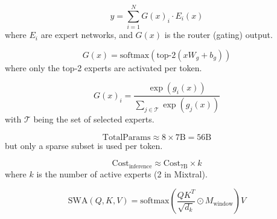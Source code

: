 
\begin{equation}
y = \sum_{i=1}^{N} G(x)_i \cdot E_i(x)
\end{equation}
where \(E_i\) are expert networks, and \(G(x)\) is the router (gating) output.

\begin{equation}
G(x) = \text{softmax}\left( \text{top-2}(x W_g + b_g) \right)
\end{equation}
where only the top‑2 experts are activated per token.

\begin{equation}
G(x)_i = \frac{\exp(g_i(x))}{\sum_{j \in \mathcal{T}} \exp(g_j(x))}
\end{equation}
with \(\mathcal{T}\) being the set of selected experts.

\begin{equation}
\text{TotalParams} \approx 8 \times 7\text{B} = 56\text{B}
\end{equation}
but only a sparse subset is used per token.

\begin{equation}
\text{Cost}_{\text{inference}} \approx \text{Cost}_{7\text{B}} \times k
\end{equation}
where \(k\) is the number of active experts (2 in Mixtral).

\begin{equation}
\text{SWA}(Q, K, V) = \text{softmax}\left( \frac{QK^T}{\sqrt{d_k}} \odot M_{\text{window}} \right) V
\end{equation}